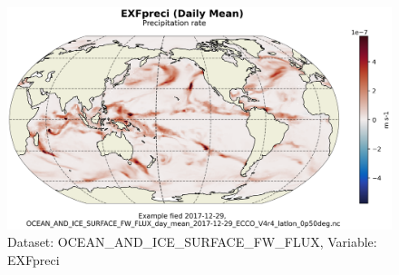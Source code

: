 \begin{figure}[H]
\centering
\includegraphics[scale=0.55]{../images/plots/latlon_plots/Ocean_and_Sea-Ice_Surface_Freshwater_Fluxes/EXFpreci.png}
\caption{Dataset: OCEAN\_AND\_ICE\_SURFACE\_FW\_FLUX, Variable: EXFpreci}
\label{tab:table-OCEAN_AND_ICE_SURFACE_FW_FLUX_EXFpreci-Plot}
\end{figure}
\pagebreak
